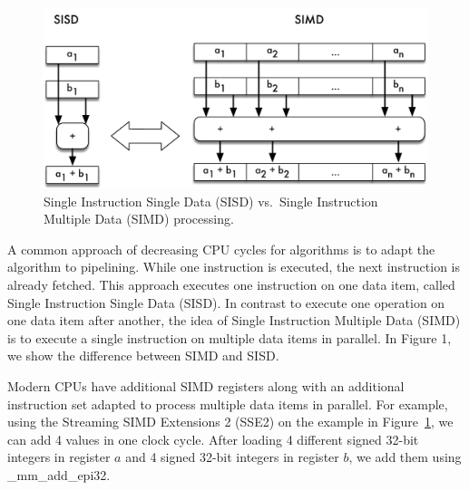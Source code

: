 \documentclass[runningheads,a4paper]{llncs}
\begin{document}
\begin{figure} \vspace{-20pt}
  \begin{center}
	\includegraphics[width=.45\textwidth]{SIMD}
	\caption{Single Instruction Single Data (SISD) vs.\ Single Instruction Multiple Data (SIMD) processing.}
	\label{fig}  \end{center}
  \vspace{-20pt}
\end{figure} 
A common approach of decreasing CPU cycles for algorithms is to adapt the algorithm to pipelining. While one instruction is executed, the next instruction is already fetched. This approach executes one instruction on one data item, called Single Instruction Single Data (SISD). In contrast to execute one operation on one data item after another, the idea of Single Instruction Multiple Data (SIMD) is to execute a single instruction on multiple data items in parallel. In Figure 1, we show the difference between SIMD and SISD. 

Modern CPUs have additional SIMD registers along with an additional instruction set adapted to process multiple data items in parallel. %
For example, using the Streaming SIMD Extensions 2 (SSE2) on the example in Figure~\ref{fig}, we can add 4 values in one clock cycle.
After loading 4 different signed 32-bit integers in register $a$ and 4 signed 32-bit integers in register $b$, we add them using \_mm\_add\_epi32. %
\end{document}
